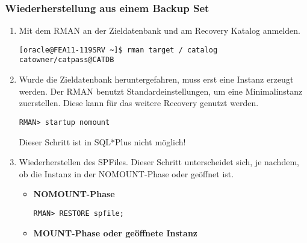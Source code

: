         \subsubsection{Wiederherstellung aus einem Backup Set}
          \begin{enumerate}
            \item Mit dem RMAN an der Zieldatenbank und am Recovery Katalog anmelden.
              \begin{lstlisting}[caption={An der Zieldatenbank und am Recovery Katalog anmelden},label=admin1410,language=rman]
[oracle@FEA11-119SRV ~]$ rman target / catalog catowner/catpass@CATDB
              \end{lstlisting}
            \item Wurde die Zieldatenbank heruntergefahren, muss erst eine Instanz erzeugt werden. Der RMAN benutzt Standardeinstellungen, um eine Minimalinstanz zuerstellen. Diese kann f\"ur das weitere Recovery genutzt werden.
              \begin{lstlisting}[caption={Zieldatenbank im RMAN in den NOMOUNT-Status bringen},label=admin1411,language=rman,alsolanguage=sqlplus]
RMAN> startup nomount
              \end{lstlisting}
              \begin{merke}
                Dieser Schritt ist in SQL*Plus nicht m\"oglich!
              \end{merke}
            \item Wiederherstellen des SPFiles. Dieser Schritt unterscheidet sich, je nachdem, ob die Instanz in der NOMOUNT-Phase oder ge\"offnet ist.
              \begin{itemize}
                \item \textbf{NOMOUNT-Phase}
                  \begin{lstlisting}[caption={Wiederherstellen des SPFiles in der NOMOUNT-Phase},label=admin1412,language=rman]
RMAN> RESTORE spfile;
                  \end{lstlisting}
                \item \textbf{MOUNT-Phase oder ge\"offnete Instanz}


\end{itemize}
\end{enumerate}
